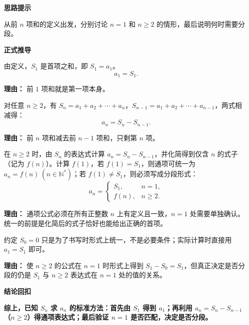 \begin{proofbox}

	\textbf{\textcolor{CProof}{思路提示}}

	从前 $n$ 项和的定义出发，分别讨论 $n=1$ 和 $n\ge2$ 的情形，最后说明何时需要分段。

	\medskip
	\textbf{\textcolor{CProof}{正式推导}}
	\begin{description}[style=nextline, leftmargin=2.8em, labelsep=0.5em, itemsep=0.55em]
		\item[\textbf{步骤一（$n=1$ 情形）：}] 由定义，$S_1$ 是首项之和，即 $S_1 = a_1$。
			\[
				a_1 = S_1.
			\]
			\par\textbf{理由：}
			前 $1$ 项和就是第一项本身。

		\item[\textbf{步骤二（$n\ge2$ 情形）：}] 对任意 $n\ge2$，有 $S_n = a_1 + a_2 + \cdots + a_n$，$S_{n-1} = a_1 + a_2 + \cdots + a_{n-1}$，两式相减得：
			\[
				a_n = S_n - S_{n-1}.
			\]
			\par\textbf{理由：}
			前 $n$ 项和减去前 $n-1$ 项和，只剩第 $n$ 项。

		\item[\textbf{步骤三（分段必要性）：}] 在 $n\ge2$ 时，由 $S_n$ 的表达式计算 $a_n = S_n - S_{n-1}$，并化简得到仅含 $n$ 的式子（记为 $f(n)$）。计算 $f(1)$，若 $f(1)=S_1$，则通项可统一为 $a_n = f(n)\ (n\in\mathbb{N}^*)$；若 $f(1)\neq S_1$，则必须写成分段形式：
			\[
				a_n = \begin{cases}
				S_1, & n=1,\\
				f(n), & n\ge2.
		\end{cases}
		\]
		\par\textbf{理由：}
		通项公式必须在所有正整数 $n$ 上有定义且一致，$n=1$ 处需要单独确认。统一的前提是化简后的式子恰好也能给出正确的首项。

	\item[\textbf{步骤四（$S_0$ 的约定）：}] 约定 $S_0=0$ 只是为了书写时形式上统一，不是必要条件；实际计算时直接用 $a_1=S_1$ 即可。
		\par\textbf{理由：}
		使 $n\ge2$ 的公式在 $n=1$ 时形式上得到 $S_1-S_0=S_1$，但真正决定是否分段的仍是 $S_1$ 与 $n\ge2$ 表达式在 $n=1$ 处的值的关系。
\end{description}

\medskip
\textbf{\textcolor{CProof}{结论回扣}}

\textbf{综上，已知 $S_n$ 求 $a_n$ 的标准方法：首先由 $S_1$ 得到 $a_1$；再利用 $a_n=S_n-S_{n-1}$（$n\ge2$）得通项表达式；最后验证 $n=1$ 是否匹配，决定是否分段。}

\end{proofbox}
